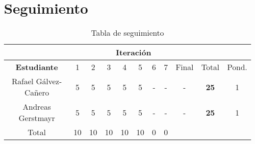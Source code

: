 \section{Seguimiento}

\begin{table}[htdp]
\begin{center}
\begin{tabular}{|c|c|c|c|c|c|c|c|c|c|c|}
\cline{2-9}
\multicolumn{1}{c}{}&\multicolumn{8}{|c|}{\textbf{Iteración}}&\multicolumn{2}{c}{}\\
\hline
\textbf{Estudiante}&1&2&3&4&5&6&7&Final&Total&Pond.\\
\hline
Rafael Gálvez-Cañero&5&5&5&5&5&-&-&-&\textbf{25}&1\\
Andreas Gerstmayr   &5&5&5&5&5&-&-&-&\textbf{25}&1\\
\hline
Total               &10&10&10&10&10&0&0&\multicolumn{2}{c}{}\\
\cline{1-8}
\end{tabular}
\end{center}
\caption{Tabla de seguimiento}
\label{tab:seguimiento}
\end{table}%

